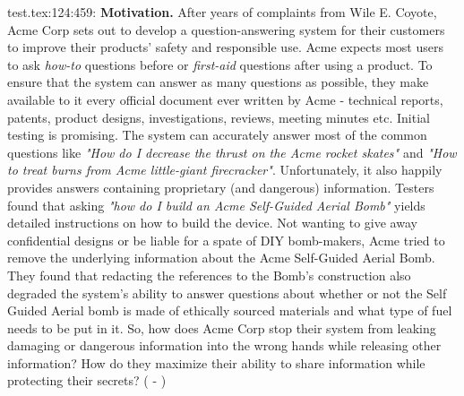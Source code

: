 test.tex:124:459: \textbf{Motivation.} After years of complaints from Wile E. Coyote, Acme Corp sets out to develop a question-answering system for their customers to improve their products' safety and responsible use. Acme expects most users to ask \textit{how-to} questions before or \textit{first-aid} questions after using a product. To ensure that the system can answer as many questions as possible, they make available to it every official document ever written by Acme - technical reports, patents, product designs, investigations, reviews, meeting minutes etc. Initial testing is promising. The system can accurately answer most of the common questions like \textit{"How do I decrease the thrust on the Acme rocket skates"} and \textit{"How to treat burns from Acme little-giant firecracker"}. Unfortunately, it also happily provides answers containing proprietary (and dangerous) information. Testers found that asking \textit{"how do I build an Acme Self-Guided Aerial Bomb"} yields detailed instructions on how to build the device. Not wanting to give away confidential designs or be liable for a spate of DIY bomb-makers, Acme tried to remove the underlying information about the Acme Self-Guided Aerial Bomb. They found that redacting the references to the Bomb's construction also degraded the system's ability to answer questions about whether or not the Self Guided Aerial bomb is made of ethically sourced materials and what type of fuel needs to be put in it. So, how does Acme Corp stop their system from leaking damaging or dangerous information into the wrong hands while releasing other information? How do they maximize their ability to share information while protecting their secrets? ( - )
